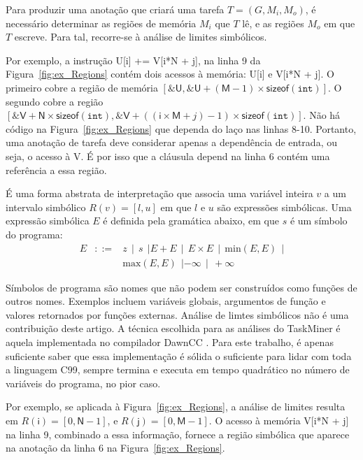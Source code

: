\documentclass[sigplan,10pt,review]{acmart}
\newcommand\dawn{\mbox{\textsf{DawnCC}}}
\newcommand\Taskminer{\mbox{\textsf{TaskMiner}}}
\begin{document}
Para produzir uma anotação que criará uma tarefa $T = (G, M_i, M_o)$,
é necessário determinar as regiões de memória $M_i$ que $T$ lê, e as regiões
$M_o$ em que $T$ escreve. Para tal, recorre-se à análise de limites simbólicos.
 
 Por exemplo, a instrução \textsf{U[i] += V[i*N + j]}, na linha 9 da Figura~\ref{fig:ex_Regions}
 contém dois acessos à memória: \textsf{U[i]} e
\textsf{V[i*N + j]}.
 O primeiro cobre a região de memória $[\mathtt{\&}\mathsf{U},
\mathtt{\&}\mathsf{U} + (\mathsf{M} - 1) \times \mathsf{sizeof}(\mathtt{int})]$.
O segundo cobre a região 
$[\mathtt{\&}\mathsf{V} + \mathsf{N} \times \mathsf{sizeof}(\mathtt{int}), \mathtt{\&}\mathsf{V} + ((\mathsf{i} \times \mathsf{M} + j) - 1) \times \mathsf{sizeof}(\mathtt{int})]$.
Não há código na Figura~\ref{fig:ex_Regions} que dependa do laço nas linhas 8-10.
Portanto, uma anotação de tarefa deve considerar apenas a dependência de entrada, ou seja,
o acesso à \textsf{V}. É por isso que a cláusula \textsf{depend} na linha 6 contém uma referência
a essa região.

\begin{definition} 
\label{def:limites}
É uma forma abstrata de interpretação que associa uma variável inteira $v$
a um intervalo simbólico $R(v) = [l, u]$ em que $l$ e $u$ são expressões simbólicas.
Uma expressão simbólica $E$ é definida pela gramática abaixo, em que $s$ é um 
símbolo do programa:
\renewcommand{\arraystretch}{0.9}
\[
\begin{array}{rcl}
E & ::= & z \ \ | \ \ s \ \ | E + E \ \ | \ \ E \times E \ \ | \ \  \mbox{min}(E, E) \ \ | \\
&  & \mbox{max}(E, E) \ \ | -\infty \ \ | \ \ +\infty
\end{array}
\]
\end{definition}

Símbolos de programa são nomes que não podem ser construídos como funções de
outros nomes. Exemplos incluem variáveis globais, argumentos de função e valores retornados
por funções externas. Análise de limtes simbólicos não é uma contribuição deste artigo. A técnica
escolhida para as análises do {\Taskminer} é aquela implementada no compilador \dawn{} \cite{Mendonca17}.
Para este trabalho, é apenas
suficiente saber que essa implementação é sólida o suficiente para lidar com toda a linguagem C99, sempre termina
e executa em tempo quadrático no número de variáveis do programa, no pior caso.

Por exemplo, se aplicada à Figura~\ref{fig:ex_Regions}, a análise de limites resulta em 
$R(\mathsf{i}) = [0, \mathsf{N} - 1]$, e $R(\mathsf{j}) = [0, \mathsf{M} - 1]$.
O acesso à memória \textsf{V[i*N + j]} na linha 9, combinado a essa informação, fornece
a região simbólica que aparece na anotação da linha 6 na Figura~\ref{fig:ex_Regions}.
\end{document}
